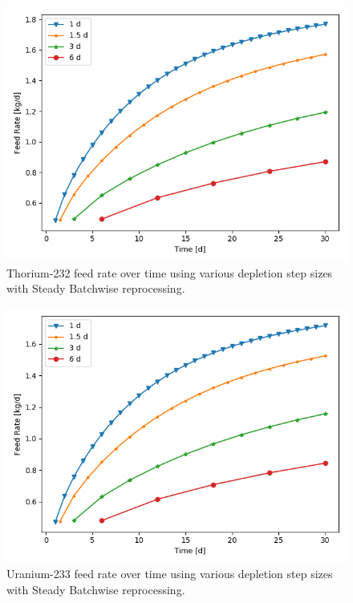 \begin{figure}[H]
  \centering
  \includegraphics[scale=0.7]{images/feed_Th232_6d_sp_comp.png}
  \caption{Thorium-232 feed rate over time using various depletion step sizes with Steady Batchwise reprocessing.}
   \label{fig:steady-batch-th-repr}
\end{figure}

\begin{figure}[H]
  \centering
  \includegraphics[scale=0.7]{images/feed_U233_6d_sp_comp.png}
  \caption{Uranium-233 feed rate over time using various depletion step sizes with Steady Batchwise reprocessing.}
   \label{fig:steady-batch-u-repr}
\end{figure}

